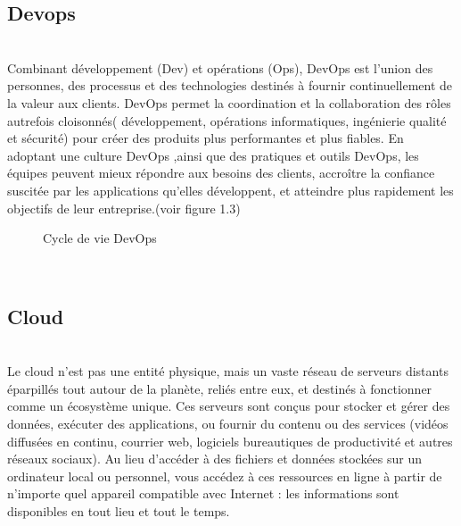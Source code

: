 \subsection{\Large  Devops}
\texttt{}\\[0.5cm]
\textsf{\selectfont{} Combinant développement (Dev) et opérations (Ops), DevOps est l'union des personnes, des processus et des technologies destinés à fournir continuellement de la valeur aux clients.
    DevOps permet la coordination et la collaboration des rôles autrefois cloisonnés( développement, opérations informatiques, ingénierie qualité et sécurité) pour créer des produits plus performantes et plus fiables. En adoptant une culture DevOps ,ainsi que des pratiques et outils DevOps, les équipes peuvent mieux répondre aux besoins des clients, accroître la confiance suscitée par les applications qu'elles développent, et atteindre plus rapidement les objectifs de leur entreprise.\cite{1}(voir figure 1.3)}
    \begin{figure}[H]
    \begin{center}

    \end{center}

    \caption{Cycle de vie DevOps}
\end{figure}
\texttt{}\\[0.1cm]
\subsection{\Large  Cloud}
\texttt{}\\[0.1cm]
\textsf{\selectfont{} Le cloud n’est pas une entité physique, mais un vaste réseau de serveurs distants éparpillés tout autour de la planète, reliés entre eux, et destinés à fonctionner comme un écosystème unique. Ces serveurs sont conçus pour stocker et gérer des données, exécuter des applications, ou fournir du contenu ou des services (vidéos diffusées en continu, courrier web, logiciels bureautiques de productivité et autres réseaux sociaux). Au lieu d’accéder à des fichiers et données stockées sur un ordinateur local ou personnel, vous accédez à ces ressources en ligne à partir de n’importe quel appareil compatible avec Internet : les informations sont disponibles en tout lieu et tout le temps.\cite{2} }
